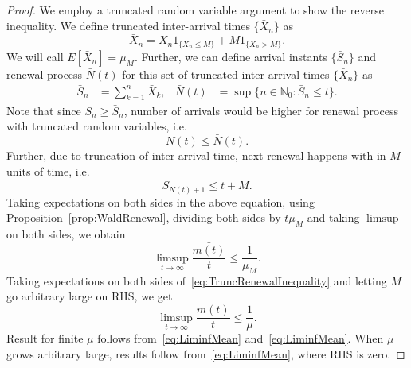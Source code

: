 \documentclass[a4paper,10pt]{article}
\begin{document}
\begin{proof}
We employ a truncated random variable argument to show the reverse inequality. We define truncated inter-arrival times $\{\bar{X}_n\}$ as 
\begin{equation*}
\bar{X}_n = X_n 1_{\{X_n \leq M\}} + M1_{\{X_n > M\}}.
\end{equation*}
We will call $E[\bar{X}_n] = \mu_M$. Further, we can define arrival instants $\{\bar{S}_n\}$ and renewal process $\bar{N}(t)$ for this set of truncated inter-arrival times $\{\bar{X}_n\}$ as 
\begin{align*}
 \bar{S}_n &= \sum_{k=1}^n \bar{X}_k, & \bar{N}(t) &= \sup\{n \in \mathbb{N}_0: \bar{S}_n \leq t\}.
\end{align*}
Note that since $S_n \geq \bar{S}_n$, number of arrivals would be higher for renewal process with truncated random variables, i.e. 
\begin{equation}
\label{eq:TruncRenewalInequality}
  N(t) \leq \bar{N}(t).
\end{equation}
Further, due to truncation of inter-arrival time, next renewal happens with-in $M$ units of time, i.e.
\begin{equation*}
  \bar{S}_{N(t)+1} \leq t+M.
\end{equation*}
Taking expectations on both sides in the above equation, using Proposition~\ref{prop:WaldRenewal}, dividing both sides by $t \mu_M$ and taking $\limsup$ on both sides, we obtain
\begin{equation*}
\limsup_{t \to \infty}\frac{\bar{m(t)}}{t} \leq \frac{1}{\mu_M}.
\end{equation*}
Taking expectations on both sides of~\eqref{eq:TruncRenewalInequality} and letting $M$ go arbitrary large on RHS, we get
\begin{equation}
\label{eq:LimsupMean}
\limsup_{t \to \infty}\frac{m(t)}{t} \leq \frac{1}{\mu}.
\end{equation}
Result for finite $\mu$ follows from~\eqref{eq:LiminfMean} and~\eqref{eq:LiminfMean}. When $\mu$ grows arbitrary large, results follow from~\eqref{eq:LiminfMean}, where RHS is zero. 
\end{proof}
\end{document}

